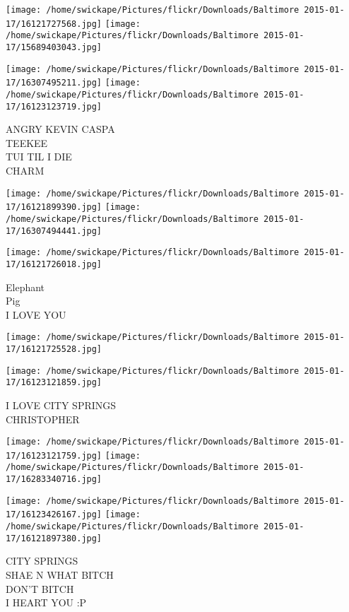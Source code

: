 \documentclass[10pt,letterpaper]{article}
\begin{document}
\texttt{[image: /home/swickape/Pictures/flickr/Downloads/Baltimore 2015-01-17/16121727568.jpg]}
\texttt{[image: /home/swickape/Pictures/flickr/Downloads/Baltimore 2015-01-17/15689403043.jpg]}

\texttt{[image: /home/swickape/Pictures/flickr/Downloads/Baltimore 2015-01-17/16307495211.jpg]}
\texttt{[image: /home/swickape/Pictures/flickr/Downloads/Baltimore 2015-01-17/16123123719.jpg]}

ANGRY KEVIN CASPA\\
TEEKEE\\
TUI TIL I DIE\\
CHARM\\
\pagebreak

\texttt{[image: /home/swickape/Pictures/flickr/Downloads/Baltimore 2015-01-17/16121899390.jpg]}
\texttt{[image: /home/swickape/Pictures/flickr/Downloads/Baltimore 2015-01-17/16307494441.jpg]}

\texttt{[image: /home/swickape/Pictures/flickr/Downloads/Baltimore 2015-01-17/16121726018.jpg]}

Elephant\\
Pig\\
I LOVE YOU\\
\pagebreak

\texttt{[image: /home/swickape/Pictures/flickr/Downloads/Baltimore 2015-01-17/16121725528.jpg]}

\vspace{0.25in}
\texttt{[image: /home/swickape/Pictures/flickr/Downloads/Baltimore 2015-01-17/16123121859.jpg]}

I LOVE CITY SPRINGS\\
CHRISTOPHER\\
\pagebreak

\texttt{[image: /home/swickape/Pictures/flickr/Downloads/Baltimore 2015-01-17/16123121759.jpg]}
\texttt{[image: /home/swickape/Pictures/flickr/Downloads/Baltimore 2015-01-17/16283340716.jpg]}

\texttt{[image: /home/swickape/Pictures/flickr/Downloads/Baltimore 2015-01-17/16123426167.jpg]}
\texttt{[image: /home/swickape/Pictures/flickr/Downloads/Baltimore 2015-01-17/16121897380.jpg]}

CITY SPRINGS\\
SHAE N WHAT BITCH\\
DON'T BITCH\\
I HEART YOU :P\\
\pagebreak
\end{document}
